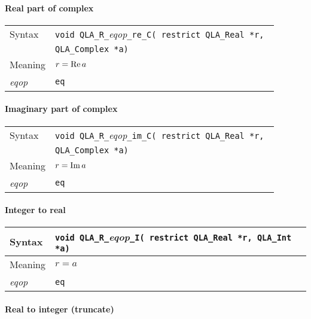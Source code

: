 \documentclass{article}
\renewcommand{\Re}{\mathop{\rm Re}}
\renewcommand{\Im}{\mathop{\rm Im}}
\newcommand{\tReal}{QLA\ttdash Real }
\newcommand{\tComplex}{QLA\ttdash Complex }
\newcommand{\tInt}{QLA\ttdash Int }
\newcommand{\namespace}{QLA}
\newcommand{\ttdash}{{\tt \_}}
\newcommand{\extraarg}{}
\newcommand{\protoUnarySingleTypesRI}{{\tt void \namespace}\ttdash{\tt R}\ttdash{\it eqop}\ttdash{\tt I}{\tt ( restrict \tReal *r, \tInt *a\extraarg)}}
\newcommand{\protoUnarySingleTypesQual}[5]{{\tt void \namespace}\ttdash{\tt #1}\ttdash{\it eqop}\ttdash#2\ttdash{\tt #3}{\tt ( restrict #4 *r, }\\
  & {\tt #5 *a\extraarg)}}
\begin{document}
\paragraph{Real part of complex}

\begin{flushleft}
  \begin{tabular}{|l|l|}
  \hline
  Syntax      & \protoUnarySingleTypesQual{R}{\tt re}{C}{\tReal}{\tComplex} \\
  \hline
  Meaning     & $r = \Re a$ \\
  \hline
  {\it eqop}  & {\tt eq} \\
  \hline
  \end{tabular}
\end{flushleft}

\paragraph{Imaginary part of complex}

\begin{flushleft}
  \begin{tabular}{|l|l|}
  \hline
  Syntax      & \protoUnarySingleTypesQual{R}{\tt im}{C}{\tReal}{\tComplex} \\
  \hline
  Meaning     & $r = \Im a$ \\
  \hline
  {\it eqop}  & {\tt eq} \\
  \hline
  \end{tabular}
\end{flushleft}

\paragraph{Integer to real}

\begin{flushleft}
  \begin{tabular}{|l|l|}
  \hline
  Syntax      & \protoUnarySingleTypesRI \\
  \hline
  Meaning     & $r = a$ \\
  \hline
  {\it eqop}  & {\tt eq} \\
  \hline
  \end{tabular}
\end{flushleft}

\paragraph{Real to integer (truncate)}
\end{document}
